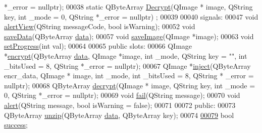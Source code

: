 \begin{DoxyCode}
       *\_error = \textcolor{keyword}{nullptr});
00038     \textcolor{keyword}{static} QByteArray \hyperlink{class_model_p_c_a902abaea4f07995b48c0f2fea6eceb7c}{Decrypt}(QImage * image, QString key, \textcolor{keywordtype}{int} \_mode = 0, QString *\_error = \textcolor{keyword}{nullptr})
      ;
00039 
00040 signals:
00047     \textcolor{keywordtype}{void} \hyperlink{class_model_p_c_af0217a7ca5671e26090dc50a5dccdaf5}{alertView}(QString messageCode, \textcolor{keywordtype}{bool} isWarning);
00052     \textcolor{keywordtype}{void} \hyperlink{class_model_p_c_a0855107fb0ccc247cd9e893fae9bb08a}{saveData}(QByteArray \hyperlink{namespace_errors_dict_setup_adf4c30d205d29df7343e26f7c62b0685}{data});
00057     \textcolor{keywordtype}{void} \hyperlink{class_model_p_c_a41f5e2e8022679046e4d3fa1109025fa}{saveImage}(QImage *image);
00063     \textcolor{keywordtype}{void} \hyperlink{class_model_p_c_afdcd80f0ed5062e145a71f09b0897547}{setProgress}(\textcolor{keywordtype}{int} val);
00064 
00065 \textcolor{keyword}{public} slots:
00066     QImage *\hyperlink{class_model_p_c_a6f191f62d4635d0d3555fcc0be298794}{encrypt}(QByteArray \hyperlink{namespace_errors_dict_setup_adf4c30d205d29df7343e26f7c62b0685}{data}, QImage *image, \textcolor{keywordtype}{int} \_mode, QString key = \textcolor{stringliteral}{""}, \textcolor{keywordtype}{int} \_bitsUsed =
       8, QString *\_error = \textcolor{keyword}{nullptr});
00067     QImage *\hyperlink{class_model_p_c_aada6a04d81ada8f2b4ba18108c8d6f10}{inject}(QByteArray encr\_data, QImage * image, \textcolor{keywordtype}{int} \_mode, \textcolor{keywordtype}{int} \_bitsUsed = 8, QString *
      \_error = \textcolor{keyword}{nullptr});
00068     QByteArray \hyperlink{class_model_p_c_a5995215a34a1e1f504035715a8013809}{decrypt}(QImage * image, QString key, \textcolor{keywordtype}{int} \_mode = 0, QString *\_error = \textcolor{keyword}{nullptr});
00069     \textcolor{keywordtype}{void} \hyperlink{class_model_p_c_a47464b59b7e37fcee25e55475708aabd}{fail}(QString message);
00070     \textcolor{keywordtype}{void} \hyperlink{class_model_p_c_a9079a101d83672aa48fd2dbac797de40}{alert}(QString message, \textcolor{keywordtype}{bool} isWarning = \textcolor{keyword}{false});
00071 
00072 \textcolor{keyword}{public}:
00073     QByteArray \hyperlink{class_model_p_c_a6da88f166785a49f73b22c169f956fd0}{unzip}(QByteArray \hyperlink{namespace_errors_dict_setup_adf4c30d205d29df7343e26f7c62b0685}{data}, QByteArray key);
00074 
\hypertarget{modelpc_8h_source_l00079}{}\hyperlink{class_model_p_c_a945ffbbc44a832b953c191debd448f4c}{00079}     \textcolor{keywordtype}{bool} \hyperlink{class_model_p_c_a945ffbbc44a832b953c191debd448f4c}{success};

\end{DoxyCode}
